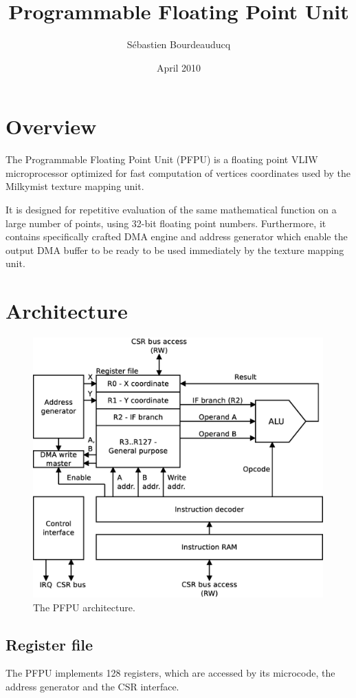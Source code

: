 \documentclass[a4paper,11pt]{article}
\title{Programmable Floating Point Unit}
\author{S\'ebastien Bourdeauducq}
\date{April 2010}
\begin{document}
\setlength{\parindent}{0pt}
\setlength{\parskip}{5pt}
\maketitle{}
\section{Overview}
The Programmable Floating Point Unit (PFPU) is a floating point VLIW microprocessor optimized for fast computation of vertices coordinates used by the Milkymist texture mapping unit.

It is designed for repetitive evaluation of the same mathematical function on a large number of points, using 32-bit floating point numbers. Furthermore, it contains specifically crafted DMA engine and address generator which enable the output DMA buffer to be ready to be used immediately by the texture mapping unit.

\section{Architecture}

\begin{figure}[H]
\centering
\includegraphics[height=100mm]{architecture.eps}
\caption{The PFPU architecture.}\label{fig:architecture}
\end{figure}

\subsection{Register file}
The PFPU implements 128 registers, which are accessed by its microcode, the address generator and the CSR interface.\\
\end{document}
